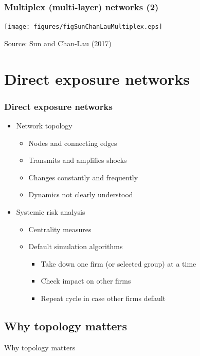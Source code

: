 \documentclass[aspectratio=43,dvipsnames,usenames, svgnames]{beamer}
\begin{document}
\begin{frame} %
\frametitle{Multiplex (multi-layer) networks (2)}
\begin{center}
	\texttt{[image: figures/figSunChanLauMultiplex.eps]}
\end{center}
\tiny{Source: Sun and Chan-Lau (2017)}
\end{frame}

\section{Direct exposure networks}

\begin{frame} %
\frametitle{Direct exposure networks}
\begin{itemize}
	\item Network topology
	\begin{itemize}
		\item Nodes and connecting edges
		\item Transmits and amplifies shocks
		\item Changes constantly and frequently
		\item Dynamics not clearly understood
	\end{itemize}
	\smallskip
	\item Systemic risk analysis
	\begin{itemize}
		\item Centrality measures
		\smallskip
		\item Default simulation algorithms
			\begin{itemize}
				\item Take down one firm (or selected group) at a time
				\item Check impact on other firms
				\item Repeat cycle in case other firms default
			\end{itemize}
	\end{itemize}
	\smallskip
\end{itemize}
\end{frame}

\subsection{Why topology matters}

\begin{frame} %
\begin{center}
	\Large{Why topology matters}
\end{center}
\end{frame}
\end{document}
